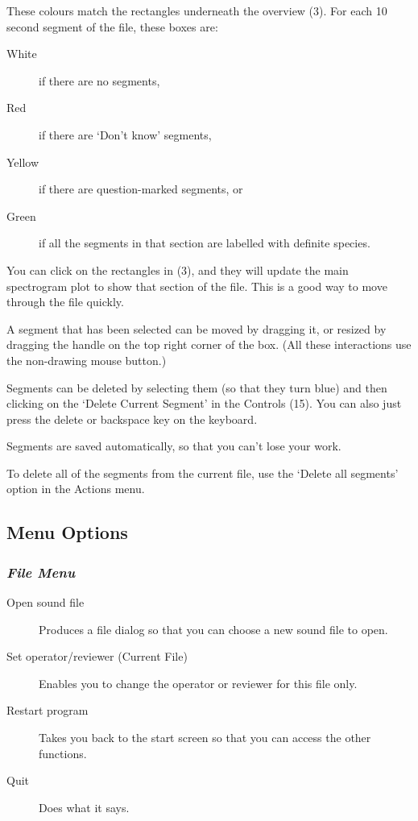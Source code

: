 \documentclass{article}
\begin{document}
These colours match the rectangles underneath the overview (3). For each 10 second segment of the file, these boxes are:
	\begin{description} 
 	\item[White] if there are no segments, 
	\item[Red] if there are `Don't know' segments, 
	\item[Yellow] if there are question-marked segments, or 
	\item[Green] if all the segments in that section are labelled with definite species. 
	\end{description}
	
You can click on the rectangles in (3), and they will update the main spectrogram plot to show that section of the file. This is a good way to move through the file quickly.

A segment that has been selected can be moved by dragging it, or resized by dragging the handle on the top right corner of the box. (All these interactions use the non-drawing mouse button.)

Segments can be deleted by selecting them (so that they turn blue) and then clicking on the `Delete Current Segment' in the Controls (15). You can also just press the delete or backspace key on the keyboard. 

Segments are saved automatically, so that you can't lose your work.

To delete all of the segments from the current file, use the `Delete all segments' option in the Actions menu. 

\subsection{Menu Options}	
\subsubsection{{\em File Menu}}

\begin{description}
\item[Open sound file] Produces a file dialog so that you can choose a new sound file to open.
\item[Set operator/reviewer (Current File)] Enables you to change the operator or reviewer for this file only. 
\item[Restart program] Takes you back to the start screen so that you can access the other functions.
\item[Quit] Does what it says.
\end{description}
\end{document}
